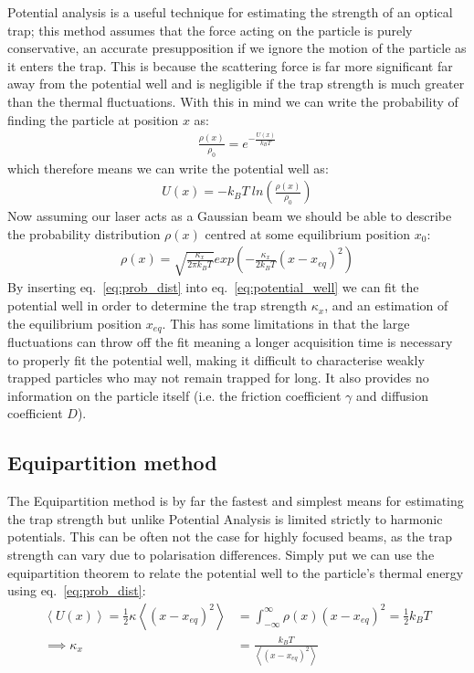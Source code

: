 Potential analysis is a useful technique for estimating the strength of an optical trap; this method assumes that the force acting on the particle is purely conservative, an accurate presupposition if we ignore the motion of the particle as it enters the trap. This is because the scattering force is far more significant far away from the potential well and is negligible if the trap strength is much greater than the thermal fluctuations. With this in mind we can write the probability of finding the particle at position $x$ as:
\begin{align}
	\frac{\rho(x)}{\rho_0} = e^{-\frac{U(x)}{k_{B}T}} 
\end{align}
which therefore means we can write the potential well as:
\begin{align}
	\label{eq:potential_well}
	U(x)=-k_BT\ ln\left(\frac{\rho(x)}{\rho_0} \right)
\end{align}
Now assuming our laser acts as a Gaussian beam we should be able to describe the probability distribution $\rho(x)$ centred at some equilibrium position $x_0$:
\begin{align}
	\label{eq:prob_dist}
	\rho(x)= \sqrt{\frac{\kappa_x}{2\pi k_BT}} exp\left(-\frac{\kappa_x}{2k_BT}(x-x_{eq})^2\right)
\end{align}
By inserting eq.~\ref{eq:prob_dist} into eq.~\ref{eq:potential_well} we can fit the potential well in order to determine the trap strength $\kappa_x$, and an estimation of the equilibrium position $x_{eq}$. This has some limitations in that the large fluctuations can throw off the fit meaning a longer acquisition time is necessary to properly fit the potential well, making it difficult to characterise weakly trapped particles who may not remain trapped for long. It also provides no information on the particle itself (i.e. the friction coefficient $\gamma$ and diffusion coefficient $D$).

\subsection{Equipartition method}
The Equipartition method is by far the fastest and simplest means for estimating the trap strength but unlike Potential Analysis is limited strictly to harmonic potentials. This can be often not the case for highly focused beams, as the trap strength can vary due to polarisation differences. Simply put we can use the equipartition theorem to relate the potential well to the particle's thermal energy using eq.~\ref{eq:prob_dist}:
\begin{align}
	\left<U(x)\right> = \frac{1}{2}\kappa\left<(x-x_{eq})^2\right> &= \int_{-\infty}^{\infty}\rho(x)(x-x_{eq})^2 = \frac{1}{2}k_BT \\
	\implies \kappa_x &= \frac{k_BT}{\left<(x-x_{eq})^2\right>} 
\end{align}

